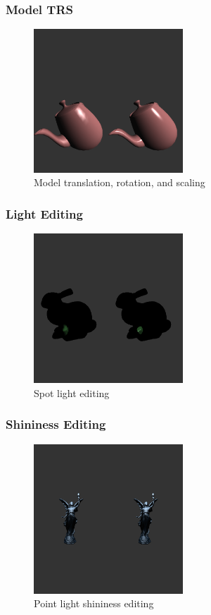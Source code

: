 \documentclass{beamer}
\begin{document}
\begin{frame}
  \frametitle{Model TRS}
  \begin{figure}
    \includegraphics[width=0.5\textwidth]{model_trs}
    \caption{Model translation, rotation, and scaling}
  \end{figure}
\end{frame}

\begin{frame}
  \frametitle{Light Editing}
  \begin{figure}
    \includegraphics[width=0.5\textwidth]{light_edit}
    \caption{Spot light editing}
  \end{figure}
\end{frame}

\begin{frame}
  \frametitle{Shininess Editing}
  \begin{figure}
    \includegraphics[width=0.5\textwidth]{shininess}
    \caption{Point light shininess editing}
  \end{figure}
\end{frame}
\end{document}
